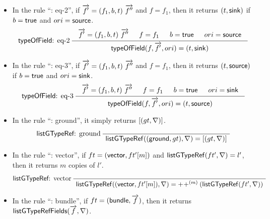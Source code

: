 \begin{itemize}
	\item In the rule ``{\typeoffield: eq-2}'', if $\overrightarrow{f'} = (f_1, b, t)\ \overrightarrow{f''}$ and $f = f_1$, then it returns $(t, {\sf sink})$ if $b = {\sf true}$ and $ori = {\sf source}$. 
	\begin{gather*}
	\infer[\typeoffield: eq-2]
	{\seqq{\typeoffield(f, \myvec{f'}, ori) = (t, \sink)}}
	{
	\begin{array}{c}
		\myvec{f'} = (f_1, b, t)\ \myvec{f''} \hspace{15pt} f = f_1  \hspace{15pt}
		b = \ltrue \hspace{15pt} ori = \source
	\end{array}
	}
	\end{gather*}
%
	\item In the rule ``\typeoffield: eq-3'', if $\overrightarrow{f'} = (f_1, b, t)\  \overrightarrow{f''} $ and $f = f_1$, then it returns $(t, {\sf source})$ if $b = {\sf true}$ and $ori = {\sf sink}$. 
	\begin{gather*}
	\infer[\typeoffield: eq-3]
	{\seqq{\typeoffield(f, \myvec{f'}, ori) = (t, \source)}}
	{
	\begin{array}{c}
 		\myvec{f'} = (f_1, b, t)\  \myvec{f''} \hspace{15pt} f = f_1 \hspace{15pt} b = \ltrue \hspace{15pt} ori = \sink
	\end{array}
	}
	\end{gather*}
%	
	\item In the rule  ``\listgtyperef: ground'',  it simply returns $[(gt, \nabla)]$.
	
	\begin{gather*}
	\infer[\listgtyperef: ground]
	{
	 \seqq{\listgtyperef((\gtype, gt), \flipped)  = [(gt, \flipped)]}
	}
	{
	}
	\end{gather*}
%	
	\item In the rule ``{\listgtyperef: vector}'', if $ft = ({\sf vector}, ft'[m])$ and ${\sf listGTypeRef}(ft', \nabla) = l'$, then it returns $m$ copies of $l'$. %
	
	\begin{gather*}
	\infer[\listgtyperef: vector]
	{
	\seqq{\listgtyperef((\vtype, ft'[m]), \flipped) = \conc{m}(\listgtyperef(ft', \flipped))}
	}
	{ 
	}
	\end{gather*}
%
	\item In the rule ``{\listgtyperef: bundle}'', if $ft= ({\sf bundle}, \overrightarrow{f})$, then it returns 
	${\sf listGTypeRefFields}(\overrightarrow{f}, \nabla)$.
	

\end{itemize}
